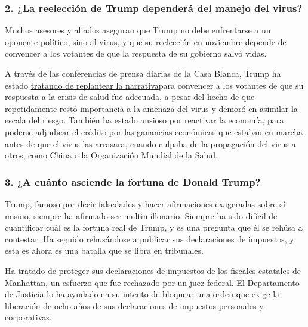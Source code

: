 \hypertarget{2-la-reelecciuxf3n-de-trump-dependeruxe1-del-manejo-del-virus}{%
\subsubsection{\texorpdfstring{\textbf{2. ¿La reelección de Trump
dependerá del manejo del
virus?}}{2. ¿La reelección de Trump dependerá del manejo del virus?}}\label{2-la-reelecciuxf3n-de-trump-dependeruxe1-del-manejo-del-virus}}

Muchos asesores y aliados aseguran que Trump no debe enfrentarse a un
oponente político, sino al virus, y que su reelección en noviembre
depende de convencer a los votantes de que la respuesta de su gobierno
salvó vidas.

A través de las conferencias de prensa diarias de la Casa Blanca, Trump
ha estado
\href{https://www.nytimes.com/interactive/2020/04/26/us/politics/trump-coronavirus-briefings-analyzed.html}{tratando
de replantear la narrativa}para convencer a los votantes de que su
respuesta a la crisis de salud fue adecuada, a pesar del hecho de que
repetidamente restó importancia a la amenaza del virus y demoró en
asimilar la escala del riesgo. También ha estado ansioso por reactivar
la economía, para poderse adjudicar el crédito por las ganancias
económicas que estaban en marcha antes de que el virus las arrasara,
cuando culpaba de la propagación del virus a otros, como China o la
Organización Mundial de la Salud.

\hypertarget{3-a-cuuxe1nto-asciende-la-fortuna-de-donald-trump}{%
\subsubsection{\texorpdfstring{\textbf{3. ¿A cuánto asciende la fortuna
de Donald
Trump?}}{3. ¿A cuánto asciende la fortuna de Donald Trump?}}\label{3-a-cuuxe1nto-asciende-la-fortuna-de-donald-trump}}

Trump, famoso por decir falsedades y hacer afirmaciones exageradas sobre
sí mismo, siempre ha afirmado ser multimillonario. Siempre ha sido
difícil de cuantificar cuál es la fortuna real de Trump, y es una
pregunta que él se rehúsa a contestar. Ha seguido rehusándose a publicar
sus declaraciones de impuestos, y esta es ahora es una batalla que se
libra en tribunales.

Ha tratado de proteger sus declaraciones de impuestos de los fiscales
estatales de Manhattan, un esfuerzo que fue rechazado por un juez
federal. El Departamento de Justicia lo ha ayudado en su intento de
bloquear una orden que exige la liberación de ocho años de sus
declaraciones de impuestos personales y corporativas.

